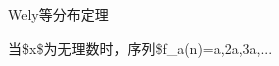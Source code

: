 
\begin{DoxyItemize}
\item Wely等分布定理

\quad{}\quad{}当\$x\$为无理数时，序列\$f\+\_\+a(n)=a,2a,3a,... 
\end{DoxyItemize}